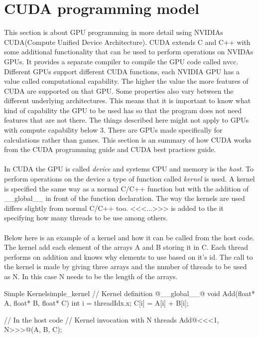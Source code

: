 \documentclass[10pt,a4paper]{report}
\newcounter{example}
\begin{document}
\section{CUDA programming model}
This section is about GPU programming in more detail using NVIDIAs CUDA(Compute Unified Device Architecture)\cite{cuda}. CUDA extends C and C++ with some additional functionality that can be used to perform operations on NVIDAs GPUs. It provides a separate compiler to compile the GPU code called nvcc\cite{cuda}. Different GPUs support different CUDA functions, each NVIDIA GPU has a value called computational capability. The higher the value the more features of CUDA are supported on that GPU. Some properties also vary between the different underlying architectures. This means that it is important to know what kind of capability the GPU to be used has so that the program does not need features that are not there. The things described here might not apply to GPUs with compute capability below 3. There are GPUs made specifically for calculations rather than games. This section is an summary of how CUDA works from the CUDA programming guide\cite{cuda} and CUDA best practices guide\cite{cuda_best_practice}.\\
\\
In CUDA the GPU is called \emph{device} and systems CPU and memory is the \emph{host}. To perform operations on the device a type of function called \emph{kernel} is used. A kernel is specified the same way as a normal C/C++ function but with the addition of \_\_global\_\_ in front of the function declaration. The way the kernels are used differs slightly from normal C/C++ too. <<<...>>> is added to the it specifying how many threads to be use among others.\cite{cuda}\\
\\
Below here is an example of a kernel and how it can be called from the host code. The kernel add each element of the arrays A and B storing it in C. Each thread performs on addition and knows why elements to use based on it's id. The call to the kernel is made by giving three arrays and the number of threads to be used as N. In this case N needs to be the length of the arrays.

\begin{example}{Simple Kernel}{simple_kernel}
// Kernel definition
@__global__@ void Add(float* A, float* B, float* C)
{
  int i = threadIdx.x;
  C[i] = A[i] + B[i];
}

// In the host code
// Kernel invocation with N threads
Add@<<<1, N>>>@(A, B, C);
\end{example}
\end{document}
